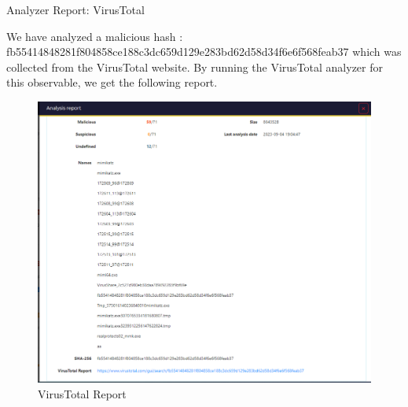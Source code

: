 \begin{frame}{Analyzer Report: VirusTotal}
\begin{justify}
    We have analyzed a malicious hash : \newline fb55414848281f804858ce188c3dc659d129e283bd62d58d34f6e6f568feab37 \newline which was collected from the VirusTotal website. By running the VirusTotal analyzer for this observable, we get the following report.
\end{justify}

 \begin{figure}[htp]
    \centering
    \includegraphics[scale=0.2]{virusTotal-1.png}
    \caption{VirusTotal Report}
    \label{fig:virusTotal-1}
\end{figure}
    
\end{frame}

